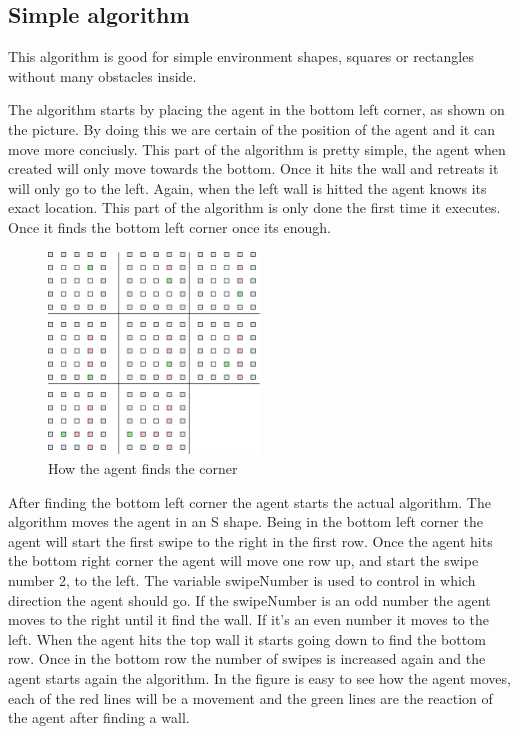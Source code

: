\subsection{Simple algorithm}
	This algorithm is good for simple environment shapes, squares or rectangles without many obstacles inside.
	
	The algorithm starts by placing the agent in the bottom left corner, as shown on the picture. 
	By doing this we are certain of the position of the agent and it can move more conciusly.
	This part of the algorithm is pretty simple, the agent when created will only move towards the bottom.
	Once it hits the wall and retreats it will only go to the left.
	Again, when the left wall is hitted the agent knows its exact location.
	This part of the algorithm is only done the first time it executes.
	Once it finds the bottom left corner once its enough.

\begin{figure}[h] \label{fig:corner}	\centering
\includegraphics[width=0.5\textwidth]{find_corner}
\caption{How the agent finds the corner}
\end{figure}

	After finding the bottom left corner the agent starts the actual algorithm.
	The algorithm moves the agent in an S shape. 
	Being in the bottom left corner the agent will start the first swipe to the right in the first row.
	Once the agent hits the bottom right corner the agent will move one row up, and start the swipe number 2, to the left.
	The variable swipeNumber is used to control in which direction the agent should go.
	If the swipeNumber is an odd number the agent moves to the right until it find the wall. If it's an even number it moves to the left.
	When the agent hits the top wall it starts going down to find the bottom row.
	Once in the bottom row the number of swipes is increased again and the agent starts again the algorithm.
	In the figure is easy to see how the agent moves, each of the red lines will be a movement and the green lines are the reaction of the agent after finding a wall.


